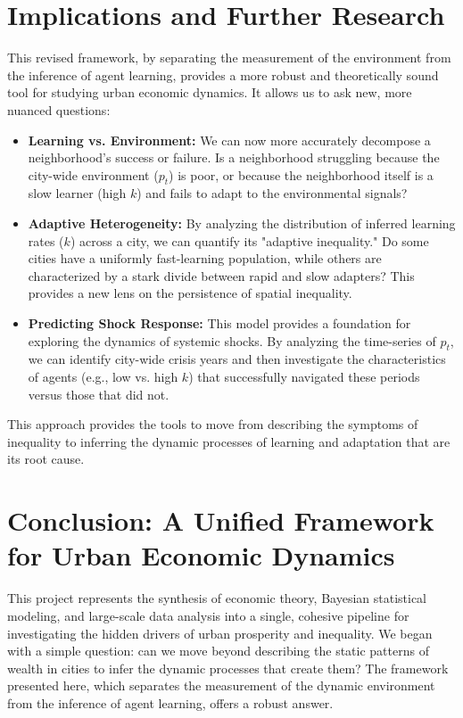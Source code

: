 \documentclass{article}
\begin{document}
\section{Implications and Further Research}
This revised framework, by separating the measurement of the environment from the inference of agent learning, provides a more robust and theoretically sound tool for studying urban economic dynamics. It allows us to ask new, more nuanced questions:
\begin{itemize}
    \item \textbf{Learning vs. Environment:} We can now more accurately decompose a neighborhood's success or failure. Is a neighborhood struggling because the city-wide environment (\(p_t\)) is poor, or because the neighborhood itself is a slow learner (high \(k\)) and fails to adapt to the environmental signals?
    \item \textbf{Adaptive Heterogeneity:} By analyzing the distribution of inferred learning rates (\(k\)) across a city, we can quantify its "adaptive inequality." Do some cities have a uniformly fast-learning population, while others are characterized by a stark divide between rapid and slow adapters? This provides a new lens on the persistence of spatial inequality.
    \item \textbf{Predicting Shock Response:} This model provides a foundation for exploring the dynamics of systemic shocks. By analyzing the time-series of \(p_t\), we can identify city-wide crisis years and then investigate the characteristics of agents (e.g., low vs. high \(k\)) that successfully navigated these periods versus those that did not.
\end{itemize}
This approach provides the tools to move from describing the symptoms of inequality to inferring the dynamic processes of learning and adaptation that are its root cause.

\section{Conclusion: A Unified Framework for Urban Economic Dynamics}
This project represents the synthesis of economic theory, Bayesian statistical modeling, and large-scale data analysis into a single, cohesive pipeline for investigating the hidden drivers of urban prosperity and inequality. We began with a simple question: can we move beyond describing the static patterns of wealth in cities to infer the dynamic processes that create them? The framework presented here, which separates the measurement of the dynamic environment from the inference of agent learning, offers a robust answer.
\end{document}

